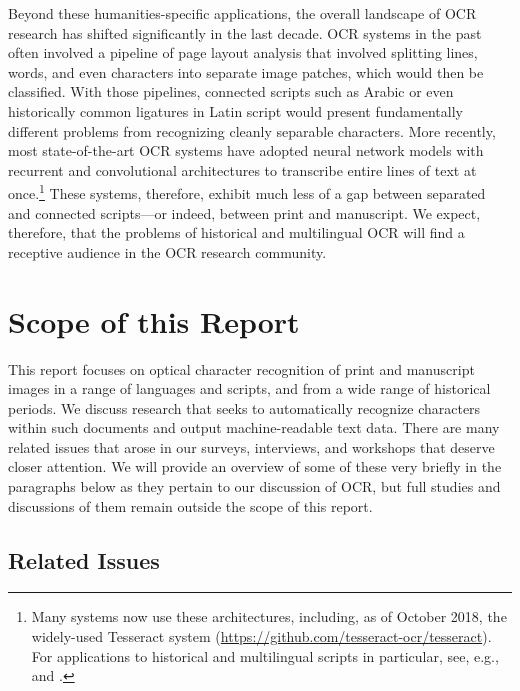 \documentclass[twoside,11pt]{report}
\begin{document}
Beyond these humanities-specific applications, the overall landscape of OCR research has shifted significantly in the last decade. OCR systems in the past often involved a pipeline of page layout analysis that involved splitting lines, words, and even characters into separate image patches, which would then be classified. With those pipelines, connected scripts such as Arabic or even historically common ligatures in Latin script would present fundamentally different problems from recognizing cleanly separable characters. More recently, most state-of-the-art OCR systems have adopted neural network models with recurrent and convolutional architectures to transcribe entire lines of text at once.\footnote{Many systems now use these architectures, including, as of October 2018, the widely-used Tesseract system (\url{https://github.com/tesseract-ocr/tesseract}).  For applications to historical and multilingual scripts in particular, see, e.g., \cite{breuel13:_high_ocr_print_englis_frakt_lstm_networ} and \cite{kiessling17:_impor_new_devel_arabog_optic}.}  These systems, therefore, exhibit much less of a gap between separated and connected scripts---or indeed, between print and manuscript. We expect, therefore, that the problems of historical and multilingual OCR will find a receptive audience in the OCR research community.

\section{Scope of this Report}

This report focuses on optical character recognition of print and manuscript images in a range of languages and scripts, and from a wide range of historical periods. We discuss research that seeks to automatically recognize characters within such documents and output machine-readable text data. There are many related issues that arose in our surveys, interviews, and workshops that deserve closer attention. We will provide an overview of some of these very briefly in the paragraphs below as they pertain to our discussion of OCR, but full studies and discussions of them remain outside the scope of this report.

\subsection{Related Issues}
\end{document}
